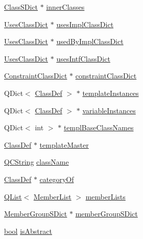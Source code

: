 \begin{DoxyCompactItemize}
\item 
\hyperlink{class_class_s_dict}{Class\+S\+Dict} $\ast$ \hyperlink{class_class_def_impl_a3032dc0d393588b7afd0c2432b350feb}{inner\+Classes}
\item 
\hyperlink{class_uses_class_dict}{Uses\+Class\+Dict} $\ast$ \hyperlink{class_class_def_impl_ac49d5feb5e7484ee50ae51873b8bc255}{uses\+Impl\+Class\+Dict}
\item 
\hyperlink{class_uses_class_dict}{Uses\+Class\+Dict} $\ast$ \hyperlink{class_class_def_impl_a578c5fd5c2fb6e5aee107a670e9e51a1}{used\+By\+Impl\+Class\+Dict}
\item 
\hyperlink{class_uses_class_dict}{Uses\+Class\+Dict} $\ast$ \hyperlink{class_class_def_impl_ab7e80405e26e2e111e5869c016cc9783}{uses\+Intf\+Class\+Dict}
\item 
\hyperlink{class_constraint_class_dict}{Constraint\+Class\+Dict} $\ast$ \hyperlink{class_class_def_impl_ac07bb35d01da6f43d0e39af700ea55db}{constraint\+Class\+Dict}
\item 
Q\+Dict$<$ \hyperlink{class_class_def}{Class\+Def} $>$ $\ast$ \hyperlink{class_class_def_impl_a40568b5135505092ae7acae3e4ce224f}{template\+Instances}
\item 
Q\+Dict$<$ \hyperlink{class_class_def}{Class\+Def} $>$ $\ast$ \hyperlink{class_class_def_impl_ac515e81dfa0ea2fe1e7aabe14d65d488}{variable\+Instances}
\item 
Q\+Dict$<$ int $>$ $\ast$ \hyperlink{class_class_def_impl_af694528f58bf5c3f872e14c364dd7f89}{templ\+Base\+Class\+Names}
\item 
\hyperlink{class_class_def}{Class\+Def} $\ast$ \hyperlink{class_class_def_impl_a14389d44bce551c00b53391115004d5f}{template\+Master}
\item 
\hyperlink{class_q_c_string}{Q\+C\+String} \hyperlink{class_class_def_impl_a5eecc11f35a74b7ac718fc46b9d8de26}{class\+Name}
\item 
\hyperlink{class_class_def}{Class\+Def} $\ast$ \hyperlink{class_class_def_impl_aa33f23ac88249219ec76053a54684ae8}{category\+Of}
\item 
\hyperlink{class_q_list}{Q\+List}$<$ \hyperlink{class_member_list}{Member\+List} $>$ \hyperlink{class_class_def_impl_a08ae5698e8b933ec25f894f6e87ad1b1}{member\+Lists}
\item 
\hyperlink{class_member_group_s_dict}{Member\+Group\+S\+Dict} $\ast$ \hyperlink{class_class_def_impl_a0210b427b08a04f20bd5eb24c3bb6f11}{member\+Group\+S\+Dict}
\item 
\hyperlink{qglobal_8h_a1062901a7428fdd9c7f180f5e01ea056}{bool} \hyperlink{class_class_def_impl_add7ec887a9774fff23c51033b0f68cd1}{is\+Abstract}

\end{DoxyCompactItemize}
